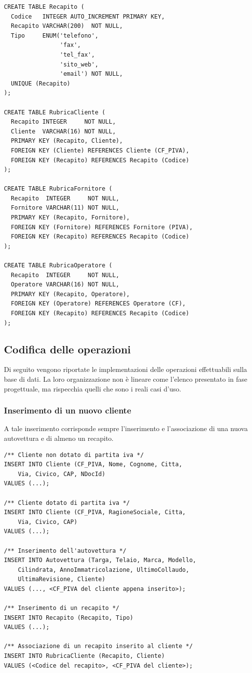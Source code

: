 \begin{lstlisting}
CREATE TABLE Recapito (
  Codice   INTEGER AUTO_INCREMENT PRIMARY KEY,
  Recapito VARCHAR(200)  NOT NULL,
  Tipo     ENUM('telefono',
                'fax',
                'tel_fax',
                'sito_web',
                'email') NOT NULL,
  UNIQUE (Recapito)
);

CREATE TABLE RubricaCliente (
  Recapito INTEGER     NOT NULL,
  Cliente  VARCHAR(16) NOT NULL,
  PRIMARY KEY (Recapito, Cliente),
  FOREIGN KEY (Cliente) REFERENCES Cliente (CF_PIVA),
  FOREIGN KEY (Recapito) REFERENCES Recapito (Codice)
);

CREATE TABLE RubricaFornitore (
  Recapito  INTEGER     NOT NULL,
  Fornitore VARCHAR(11) NOT NULL,
  PRIMARY KEY (Recapito, Fornitore),
  FOREIGN KEY (Fornitore) REFERENCES Fornitore (PIVA),
  FOREIGN KEY (Recapito) REFERENCES Recapito (Codice)
);

CREATE TABLE RubricaOperatore (
  Recapito  INTEGER     NOT NULL,
  Operatore VARCHAR(16) NOT NULL,
  PRIMARY KEY (Recapito, Operatore),
  FOREIGN KEY (Operatore) REFERENCES Operatore (CF),
  FOREIGN KEY (Recapito) REFERENCES Recapito (Codice)
);
    \end{lstlisting}

		\pagebreak
	\subsection{Codifica delle operazioni}
		Di seguito vengono riportate le implementazioni delle operazioni effettuabili sulla base di dati. La loro organizzazione non è lineare come l'elenco presentato in fase progettuale, ma rispecchia quelli che sono i reali casi d'uso.

		\subsubsection{Inserimento di un nuovo cliente}
			A tale inserimento corrisponde sempre l'inserimento e l'associazione di una nuova autovettura e di almeno un recapito.
				\begin{lstlisting}
/** Cliente non dotato di partita iva */
INSERT INTO Cliente (CF_PIVA, Nome, Cognome, Citta, 
	Via, Civico, CAP, NDocId) 
VALUES (...);

/** Cliente dotato di partita iva */
INSERT INTO Cliente (CF_PIVA, RagioneSociale, Citta, 
	Via, Civico, CAP) 
VALUES (...);

/** Inserimento dell'autovettura */
INSERT INTO Autovettura (Targa, Telaio, Marca, Modello, 
	Cilindrata, AnnoImmatricolazione, UltimoCollaudo, 
	UltimaRevisione, Cliente) 
VALUES (..., <CF_PIVA del cliente appena inserito>);

/** Inserimento di un recapito */
INSERT INTO Recapito (Recapito, Tipo)
VALUES (...);

/** Associazione di un recapito inserito al cliente */
INSERT INTO RubricaCliente (Recapito, Cliente)
VALUES (<Codice del recapito>, <CF_PIVA del cliente>);
				\end{lstlisting}

